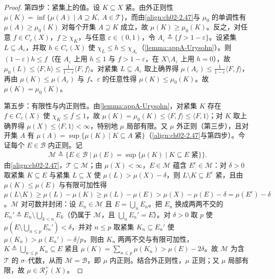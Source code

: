 \documentclass[../../main.tex]{subfiles}%
\begin{document}
\begin{proof}
第四步：紧集上的值。设 $K\subseteq X$ 紧。由外正则性 $\mu(K)=\inf\{\mu(A)\mid A\supseteq K,\ A\in\mathscr T\}$，而由\eqref{align:ch02-2.47}与 $\mu_0$ 的单调性有 $\mu(A)\geqslant\mu_0(K)$ 对每个开集 $A\supseteq K$ 成立，故 $\mu(K)\geqslant\mu_0(K)$。反之，对任意 $f\in C_c(X)$，$f\geqslant\chi_K$，与任意 $\varepsilon\in(0,1)$，令 $A_\varepsilon\triangleq\{f>1-\varepsilon\}$。设紧集 $L\subseteq A_\varepsilon$，并取 $h\in C_c(X)$ 使 $\chi_L\leqslant h\leqslant\chi_{A_\varepsilon}$（\cref{lemma:appA-Urysohn}）。则 $(1-\varepsilon)h\leqslant f$（在 $A_\varepsilon$ 上用 $h\leqslant1$ 与 $f>1-\varepsilon$，在 $X\setminus A_\varepsilon$ 上用 $h=0$），故 $\mu_0(L)\leqslant\langle F,h\rangle\leqslant\frac1{1-\varepsilon}\langle F,f\rangle$。对紧集 $L\subseteq A_\varepsilon$ 取上确界得 $\mu(A_\varepsilon)\leqslant\frac1{1-\varepsilon}\langle F,f\rangle$，再由 $\mu(K)\leqslant\mu(A_\varepsilon)$ 与 $f$、$\varepsilon$ 的任意性得 $\mu(K)\leqslant\mu_0(K)$。故 $\mu(K)=\mu_0(K)$。

第五步：有限性与内正则性。由\cref{lemma:appA-Urysohn}，对紧集 $K$ 存在 $f\in C_c(X)$ 使 $\chi_K\leqslant f\leqslant1$，故 $\mu(K)=\mu_0(K)\leqslant\langle F,f\rangle\leqslant\langle F,1\rangle$；对 $K$ 取上确界得 $\mu(X)\leqslant\langle F,1\rangle<\infty$，特别地 $\mu$ 局部有限。又 $\mu$ 外正则（第三步），且对开集 $A$ 有 $\mu(A)=\sup\{\mu(K)\mid K\subseteq A\text{ 紧}\}$（\eqref{align:ch02-2.47}与第四步）。今证每个 $E\in\mathscr B$ 内正则。记
\begin{align*}
\mathscr M\triangleq\{E\in\mathscr B\mid\mu(E)=\sup\{\mu(K)\mid K\subseteq E\text{ 紧}\}\}.
\end{align*}
由\eqref{align:ch02-2.47}，$\mathscr T\subseteq\mathscr M$；由 $\mu(X)<\infty$，$E\in\mathscr M$ 蕴含 $E^c\in\mathscr M$：对 $\delta>0$ 取紧集 $K\subseteq E$ 与紧集 $L\subseteq X$ 使 $\mu(L)>\mu(X)-\delta$，则 $L\setminus K\subseteq E^c$ 紧，且由 $\mu(K)\leqslant\mu(E)$ 与有限可加性得 $\mu(L\setminus K)\geqslant\mu(L)-\mu(K)\geqslant\mu(L)-\mu(E)>\mu(X)-\mu(E)-\delta=\mu(E^c)-\delta$。$\mathscr M$ 对可数并封闭：设 $E_n\in\mathscr M$ 且 $E=\bigcup_nE_n$。把 $E_n$ 换成两两不交的 $E_n'\triangleq E_n\setminus\bigcup_{k<n}E_k$（仍属于 $\mathscr M$，且 $\bigcup_nE_n'=E$）。对 $\delta>0$ 取 $p$ 使 $\mu(E\setminus\bigcup_{n\leqslant p}E_n')<\delta$，并对 $n\leqslant p$ 取紧集 $K_n\subseteq E_n'$ 使 $\mu(K_n)>\mu(E_n')-\delta/p$，则由 $K_n$ 两两不交与有限可加性，$K\triangleq\bigcup_{n\leqslant p}K_n\subseteq E$ 紧且 $\mu(K)=\sum_{n\leqslant p}\mu(K_n)>\mu(E)-2\delta$。故 $\mathscr M$ 为含 $\mathscr T$ 的 $\sigma$--代数，从而 $\mathscr M=\mathscr B$，即 $\mu$ 内正则。结合外正则性，$\mu$ 正则；又 $\mu$ 局部有限，故 $\mu\in\mathscr R^+_f(X)$。


\end{proof}
\end{document}
